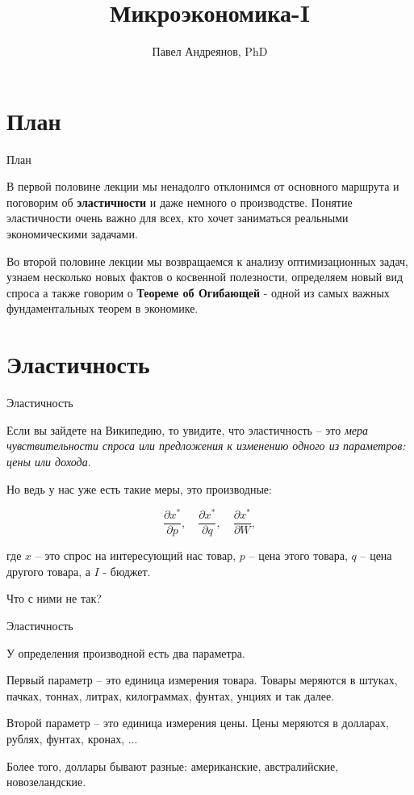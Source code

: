 \documentclass{beamer}
\title{
Микроэкономика-I
}
\author{
Павел Андреянов, PhD
}
\begin{document}
\maketitle

\section{План}

\begin{frame}{План}

В первой половине лекции мы ненадолго отклонимся от основного маршрута и поговорим об \textbf{эластичности} и даже немного о производстве. Понятие эластичности очень важно для всех, кто хочет заниматься реальными экономическими задачами. %

Во второй половине лекции мы возвращаемся к анализу оптимизационных задач, узнаем несколько новых фактов о косвенной полезности, определяем новый вид спроса а также говорим о \textbf{Теореме об Огибающей} - одной из самых важных фундаментальных теорем в экономике.

\end{frame}


\section{Эластичность}

\begin{frame}{Эластичность}

Если вы зайдете на Википедию, то увидите, что эластичность – это \textit{мера чувствительности спроса или предложения к изменению одного из параметров: цены или дохода}. 

Но ведь у нас уже есть такие меры, это производные:

$$\frac{\partial x^{\ast}}{\partial p}, \quad \frac{\partial x^{\ast}}{\partial q}, \quad \frac{\partial x^{\ast}}{\partial W},$$

где $x$ – это спрос на интересующий нас товар, $p$ – цена этого товара, $q$ – цена другого товара, а $I$ - бюджет. 

Что с ними не так?

\end{frame}

\begin{frame}{Эластичность}

У определения производной есть два параметра. 

Первый параметр – это единица измерения товара. Товары меряются в штуках, пачках, тоннах, литрах, килограммах, фунтах, унциях и так далее. 

Второй параметр – это единица измерения цены. Цены меряются в долларах, рублях, фунтах, кронах, ... 

Более того, доллары бывают разные: американские, австралийские, новозеландские. 

\end{frame}
\end{document}
